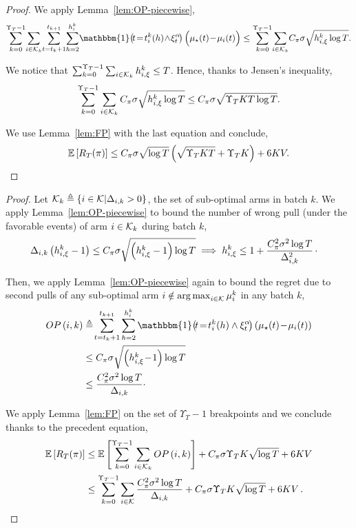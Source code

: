 \restapiecewisetheorem*
\begin{proof}

We apply Lemma~\ref{lem:OP-piecewise},
\[\sum_{k=0}^{\Upsilon_T-1} \! \sum_{i \in \mathcal{K}_{k}} \!\sum_{t=t_{k}+1}^{t_{k+1}} \! \sum_{h=2}^{h_{i}^{k}} \!\mathbbm{1}\!\left( \!t\!=\!t_{i}^{k}(h)\!\land\!\HPevent\!\right)\Big(\mu_{\star}(t)\!-\!\mu_{i}(t)\Big) \leq  \sum_{k=0}^{\Upsilon_T-1} \!\sum_{i\in\arms_k}\!  C_\pi \sigma \sqrt{h_{i,\xi}^k\log{T}} .\]

We notice that $ \sum_{k=0}^{\Upsilon_T -1}\sum_{i\in\mathcal{K}_k} h_{i,\xi}^k\leq T$. Hence, thanks to Jensen's inequality, 
\[
\sum_{k=0}^{\Upsilon_T-1} \sum_{i\in\mathcal{K}_k} C_\pi\sigma \sqrt{h_{i,\xi}^k\log{T}} \leq  C_\pi \sigma \sqrt{ \Upsilon_T K T\log{T}}.
\]

We use Lemma~\ref{lem:FP} with the last equation and conclude,
\[
\mathbb{E}\left[R_T(\pi)\right] \leq C_\pi \sigma \sqrt{\log{T}} \left( \sqrt{\Upsilon_T KT} + \Upsilon_T K\right) + 6KV.
\]
\end{proof}

\restapiecewisetheorempd*
\begin{proof}
Let $\mathcal{K}_k \triangleq \left\{ i \in \mathcal{K} | \Delta_{i,k} > 0\right\}$, the set of sub-optimal arms in batch $k$.
We apply Lemma~\ref{lem:OP-piecewise} to bound the number of wrong pull (under the favorable events) of arm $i\in \mathcal{K}_k$ during batch $k$,
\begin{align*}
     \Delta_{i,k} \left(h^k_{i, \xi} -1\right) & \leq C_\pi \sigma \sqrt{\left(h_{i,\xi}^k-1\right)\log{T}} \implies h_{i,\xi}^k \leq 1 + \frac{C_\pi^2 \sigma^2\log{T}}{\Delta_{i,k}^2}\, \cdot
\end{align*}

Then, we apply Lemma~\ref{lem:OP-piecewise} again to bound the regret due to second pulls of any sub-optimal arm $i\notin \operatorname*{arg\,max}_{i \in \mathcal{K}} \mu_i^k$ in any batch $k$,
\begin{align*}
OP\pa{i,k} &\triangleq\! \sum_{t=t_{k}+1}^{t_{k+1}} \sum_{h=2}^{h_{i}^{k}} \mathbbm{1}\!\left(\! t\!=\!t_{i}^{k}(h) \land \HPevent \!\right)\left(\mu_{\star}(t)\!-\!\mu_{i}(t)\right) \\
&\leq C_\pi \sigma \sqrt{\pa{h_{i,\xi}^k \!-\! 1}\log{T}}\\
 &\leq \frac{C_\pi^2\sigma^2\log{T}}{\Delta_{i,k}}\cdot
 \end{align*}

We apply Lemma~\ref{lem:FP} on the set of $\Upsilon_T -1$ breakpoints and we conclude thanks to the precedent equation,
\begin{align*}
\mathbb{E}\left[R_T(\pi)\right] & \leq \mathbb{E}\left[\sum_{k=0}^{\Upsilon_T-1} \sum_{i\in\mathcal{K}_k}OP\left(i,k\right) \right]+ C_\pi \sigma \Upsilon_T K\sqrt{\log{T}} + 6KV  \\
&\leq \sum_{k=0}^{\Upsilon_T-1} \sum_{i\in\mathcal{K}} \frac{C_\pi^2 \sigma^2\log{T}}{\Delta_{i,k}} +  C_\pi \sigma \Upsilon_T K \sqrt{ \log{T}} + 6KV\,.
\end{align*}
\end{proof}
